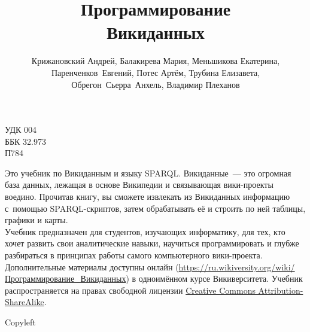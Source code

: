 \documentclass[nofonts,justified,nobib,openany,oneside]{tufte-book}%
\title{Программирование \\Викиданных}%
\author[Крижановский и др.]{Крижановский Андрей, Балакирева Мария, Меньшикова Екатерина, \mbox{Паренченков Евгений}, Потес Артём, Трубина Елизавета, \mbox{Обрегон Сьерра Анхель}, Владимир Плеханов}
\theoremstyle{definition}
\newcommand{\monthyear}{%
  \ifcase\month\or January\or February\or March\or April\or May\or June\or
  July\or August\or September\or October\or November\or
  December\fi\space\number\year
}
\newcommand{\blankpage}{\newpage\hbox{}\thispagestyle{empty}\newpage}
\begin{document}
\renewcommand\indexname{Ключевые слова и понятия}




\maketitle



\newpage
\begin{fullwidth}
УДК 004 \\
ББК 32.973 \\
\hphantom{ББК} П784
~\vfill
\thispagestyle{empty}
\setlength{\parindent}{0pt}
\setlength{\parskip}{\baselineskip}

Это учебник по Викиданным и языку SPARQL. 
Викиданные~--- это огромная база данных, лежащая в основе Википедии и связывающая вики-проекты воедино.
Прочитав книгу, вы сможете извлекать из Викиданных информацию с~помощью SPARQL-скриптов, 
затем обрабатывать её и строить по ней таблицы, графики и карты. \\ 
Учебник предназначен для студентов, %
изучающих информатику, 
для тех, кто хочет развить свои аналитические навыки, 
    научиться программировать 
    и глубже разбираться в принципах работы самого компьютерного вики-проекта. \\
    Дополнительные материалы доступны онлайн 
    (\href{https://w.wiki/62E}{https://ru.wikiversity.org/wiki/Программирование\_Викиданных}) 
    в одноимённом курсе Викиверситета.
Учебник распространяется на правах свободной лицензии 
    \href{https://creativecommons.org/licenses/by-sa/4.0/deed.ru}{Creative Commons Attribution-ShareAlike}.

Copyleft \textcopyleft\ \the\year\ \thanklessauthor

\par{\thanklesspublisher}



\end{fullwidth}
\newpage
\begin{fullwidth}



\tableofcontents

\end{fullwidth}
\end{document}
